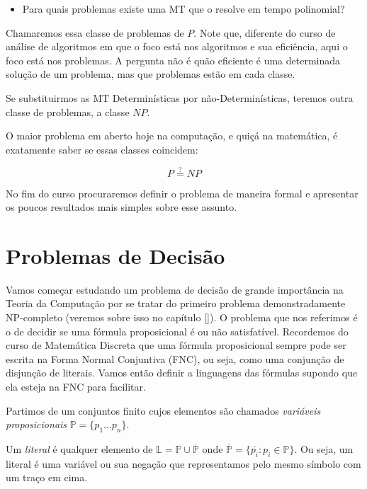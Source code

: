 \begin{itemize}
\item Para quais problemas existe uma MT que o resolve em tempo polinomial?
\end{itemize}

Chamaremos essa classe de problemas de $P$.
Note que, diferente do curso de análise de algoritmos em que o foco está nos algoritmos e sua eficiência, aqui o foco está nos problemas.
A pergunta não é quão eficiente é uma determinada solução de um problema, mas que problemas estão em cada classe.

Se substituirmos as MT Determinísticas por não-Determinísticas, teremos outra classe de problemas, a classe $NP$.

O maior problema em aberto hoje na computação, e quiçá na matemática, é exatamente saber se essas classes coincidem:

\begin{displaymath}
  P \stackrel{?}{=} NP
\end{displaymath}

No fim do curso procuraremos definir o problema de maneira formal e apresentar os poucos resultados mais simples sobre esse assunto.

\section{Problemas de Decisão}
\label{sec:problemas}

Vamos começar estudando um problema de decisão de grande importância na Teoria da Computação por se tratar do primeiro problema demonstradamente NP-completo (veremos sobre isso no capítulo \ref{}).
O problema que nos referimos é o de decidir se uma fórmula proposicional é ou não satisfatível.
Recordemos do curso de Matemática Discreta que uma fórmula proposicional sempre pode ser escrita na Forma Normal Conjuntiva (FNC), ou seja, como uma conjunção de disjunção de literais.
Vamos então definir a linguagens das fórmulas supondo que ela esteja na FNC para facilitar.

Partimos de um conjuntos finito cujos elementos são chamados {\em variáveis proposicionais} $\mathbb{P} = \{p_1 \dots p_n\}$.

Um {\em literal} é qualquer elemento de $\mathbb{L} = \mathbb{P} \cup \overline{\mathbb{P}}$ onde $\overline{\mathbb{P}} = \{\bar{p_i}: p_i \in \mathbb{P}\}$.
Ou seja, um literal é uma variável ou sua negação que representamos pelo mesmo símbolo com um traço em cima.

